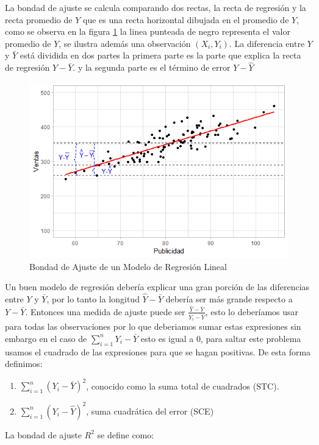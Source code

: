 \documentclass[letterpaper,]{book}
\providecommand{\tightlist}{%
  \setlength{\itemsep}{0pt}\setlength{\parskip}{0pt}}
\begin{document}
La bondad de ajuste se calcula comparando dos rectas, la recta de regresión y la recta promedio de \(Y\) que es una recta horizontal dibujada en el promedio de \(Y\), como se observa en la figura \ref{fig:determinacion} la linea punteada de negro representa el valor promedio de \(Y\), se ilustra además una observación \(\left(X_i,Y_i\right)\). La diferencia entre \(Y\) y \(\bar{Y}\) está dividida en dos partes la primera parte es la parte que explica la recta de regresión \(\hat{Y}-\bar{Y}\). y la segunda parte es el término de error \(Y-\hat{Y}\)

\begin{figure}[h]

{\centering \includegraphics[width=0.5\linewidth]{error5} 

}

\caption{Bondad de Ajuste de un Modelo de Regresión Lineal}\label{fig:determinacion}
\end{figure}

Un buen modelo de regresión debería explicar una gran porción de las diferencias entre \(Y\) y \(\bar{Y}\), por lo tanto la longitud \(\hat{Y}-\bar{Y}\) debería ser más grande respecto a \(Y-\bar{Y}\). Entonces una medida de ajuste puede ser \(\frac{\hat{Y}-\bar{Y}}{Y_i-\bar{Y}}\), esto lo deberíamos usar para todas las observaciones por lo que deberiamos sumar estas expresiones sin embargo en el caso de \(\sum_{i=1}^{n}{Y_i-\bar{Y}}\) esto es igual a \(0\), para saltar este problema usamos el cuadrado de las expresiones para que se hagan positivas. De esta forma definimos:

\begin{enumerate}
\def\labelenumi{\arabic{enumi}.}
\tightlist
\item
  \(\sum_{i=1}^{n}{\left(Y_i-\bar{Y}\right)^2}\), conocido como la suma total de cuadrados (STC).
\item
  \(\sum_{i=1}^{n}{\left(Y_i-\hat{Y}\right)^2}\), suma cuadrática del error (SCE)
\end{enumerate}

La bondad de ajuste \(R^2\) se define como:
\end{document}
